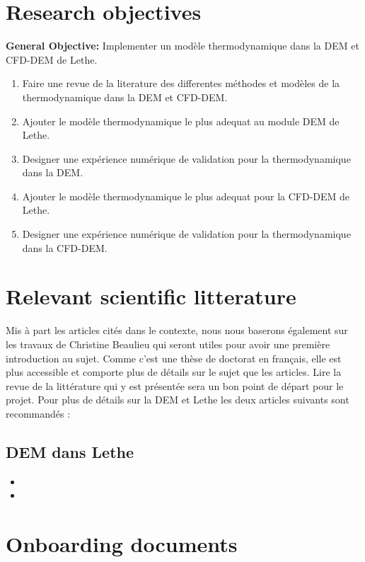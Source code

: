 \documentclass[12pt]{article}
\begin{document}
\newpage
\section{Research objectives}

\textbf{General Objective:} Implementer un modèle thermodynamique dans la DEM et CFD-DEM de Lethe.

\begin{enumerate}
  \item Faire une revue de la literature des differentes méthodes et modèles de la thermodynamique dans la DEM et CFD-DEM.
  \item Ajouter le modèle thermodynamique le plus adequat au module DEM de Lethe.
  \item Designer une expérience numérique de validation pour la thermodynamique dans la DEM.
  \item Ajouter le modèle thermodynamique le plus adequat pour la CFD-DEM de Lethe.
  \item Designer une expérience numérique de validation pour la thermodynamique dans la CFD-DEM.
\end{enumerate}


\section{Relevant scientific litterature}
Mis à part les articles cités dans le contexte, nous nous baserons également sur les travaux de Christine Beaulieu \cite{beaulieu_impact_nodate} qui seront utiles pour avoir une première introduction au sujet. Comme c'est une thèse de doctorat en français, elle est plus accessible et comporte plus de détails sur le sujet que les articles. Lire la revue de la littérature qui y est présentée sera un bon point de départ pour le projet. Pour plus de détails sur la DEM et Lethe les deux articles suivants sont recommandés :
\subsection{DEM dans Lethe}
\begin{itemize}
  \item  {}
  \item  {}
\end{itemize}

\section{Onboarding documents}
\end{document}
